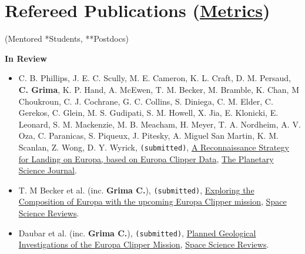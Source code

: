 \section*{Refereed Publications (\href{https://scholar.google.com/citations?user=kaUVku0AAAAJ&hl=fr}{Metrics})}

(Mentored *Students, **Postdocs)
\vspace{1em}

\textbf{In Review}
\begin{itemize}


\item
  C. B. Phillips, J. E. C. Scully, M. E. Cameron, K. L. Craft, D. M. Persaud, \textbf{C. Grima}, K. P. Hand, A. McEwen, T. M. Becker, M. Bramble, K. Chan, M Choukroun, C. J. Cochrane, G. C. Collins, S. Diniega, C. M. Elder, C. Gerekos, C. Glein, M. S. Gudipati, S. M. Howell, X. Jia, E. Klonicki, E. Leonard, S. M. Mackenzie, M. B. Meacham, H. Meyer, T. A. Nordheim, A. V. Oza, C. Paranicas, S. Piqueux, J. Pitesky, A. Miguel San Martin, K. M. Scanlan, Z. Wong, D. Y. Wyrick, \texttt{(submitted)}, \href{}{A Reconnaissance Strategy for Landing on Europa, based on Europa Clipper Data}, \ul{The Planetary Science Journal}. 

\item
  T. M Becker et al. (inc. \textbf{Grima C.}), \texttt{(submitted)}, \href{}{Exploring the Composition of Europa with the upcoming Europa Clipper mission}, \ul{Space Science Reviews}.

\item
  Daubar et al. (inc. \textbf{Grima C.}), \texttt{(submitted)}, \href{}{Planned Geological Investigations of the Europa Clipper Mission}, \ul{Space Science Reviews}.

\end{itemize}


